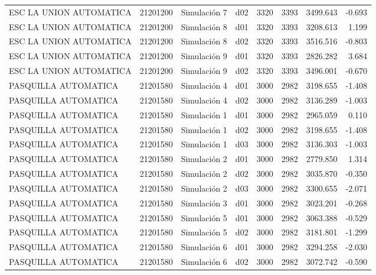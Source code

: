 \begin{landscape}
\begin{longtable}{lrlp{2cm}p{2cm}p{3cm}p{2cm}r}
 ESC LA UNION AUTOMATICA &  21201200 &   Simulación 7 &   d02 &      3320 &     3393 &  3499.643 &    -0.693 \\
 ESC LA UNION AUTOMATICA &  21201200 &   Simulación 8 &   d01 &      3320 &     3393 &  3208.613 &     1.199 \\
 ESC LA UNION AUTOMATICA &  21201200 &   Simulación 8 &   d02 &      3320 &     3393 &  3516.516 &    -0.803 \\
 ESC LA UNION AUTOMATICA &  21201200 &   Simulación 9 &   d01 &      3320 &     3393 &  2826.282 &     3.684 \\
 ESC LA UNION AUTOMATICA &  21201200 &   Simulación 9 &   d02 &      3320 &     3393 &  3496.001 &    -0.670 \\
    PASQUILLA AUTOMATICA &  21201580 &   Simulación 4 &   d01 &      3000 &     2982 &  3198.655 &    -1.408 \\
    PASQUILLA AUTOMATICA &  21201580 &   Simulación 4 &   d02 &      3000 &     2982 &  3136.289 &    -1.003 \\
    PASQUILLA AUTOMATICA &  21201580 &   Simulación 1 &   d01 &      3000 &     2982 &  2965.059 &     0.110 \\
    PASQUILLA AUTOMATICA &  21201580 &   Simulación 1 &   d02 &      3000 &     2982 &  3198.655 &    -1.408 \\
    PASQUILLA AUTOMATICA &  21201580 &   Simulación 1 &   d03 &      3000 &     2982 &  3136.303 &    -1.003 \\
    PASQUILLA AUTOMATICA &  21201580 &   Simulación 2 &   d01 &      3000 &     2982 &  2779.850 &     1.314 \\
    PASQUILLA AUTOMATICA &  21201580 &   Simulación 2 &   d02 &      3000 &     2982 &  3035.870 &    -0.350 \\
    PASQUILLA AUTOMATICA &  21201580 &   Simulación 2 &   d03 &      3000 &     2982 &  3300.655 &    -2.071 \\
    PASQUILLA AUTOMATICA &  21201580 &   Simulación 3 &   d01 &      3000 &     2982 &  3023.201 &    -0.268 \\
    PASQUILLA AUTOMATICA &  21201580 &   Simulación 5 &   d01 &      3000 &     2982 &  3063.388 &    -0.529 \\
    PASQUILLA AUTOMATICA &  21201580 &   Simulación 5 &   d02 &      3000 &     2982 &  3181.801 &    -1.299 \\
    PASQUILLA AUTOMATICA &  21201580 &   Simulación 6 &   d01 &      3000 &     2982 &  3294.258 &    -2.030 \\
    PASQUILLA AUTOMATICA &  21201580 &   Simulación 6 &   d02 &      3000 &     2982 &  3072.742 &    -0.590 \\

\end{longtable}
\end{landscape}
